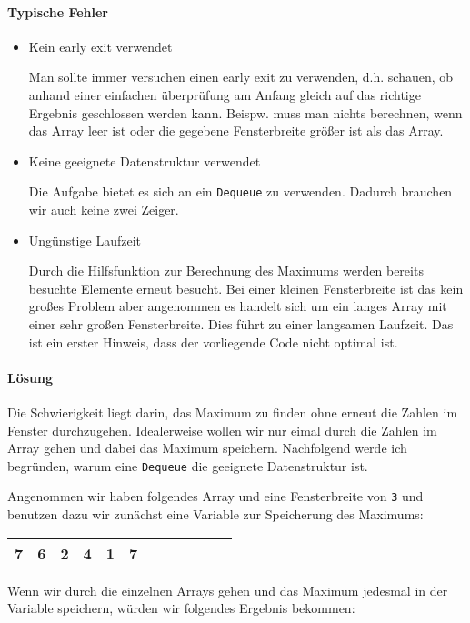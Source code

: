 \documentclass[babel]{book}
\begin{document}
\paragraph{Typische Fehler}
\begin{itemize} 
	\item Kein early exit verwendet
	
	Man sollte immer versuchen einen early exit zu verwenden, d.h. schauen, ob anhand einer einfachen überprüfung am Anfang gleich auf das richtige Ergebnis geschlossen werden kann. Beispw. muss man nichts berechnen, wenn das Array leer ist oder die gegebene Fensterbreite größer ist als das Array.
	
	\item Keine geeignete Datenstruktur verwendet
	
	Die Aufgabe bietet es sich an ein \lstinline|Dequeue| zu verwenden. Dadurch brauchen wir auch keine zwei Zeiger.
	
	\item Ungünstige Laufzeit
	
	Durch die Hilfsfunktion zur Berechnung des Maximums werden bereits besuchte Elemente erneut besucht. Bei einer kleinen Fensterbreite ist das kein großes Problem aber angenommen es handelt sich um ein langes Array mit einer sehr großen Fensterbreite. Dies führt zu einer langsamen Laufzeit. Das ist ein erster Hinweis, dass der vorliegende Code nicht optimal ist.

\end{itemize}

\paragraph{Lösung}
Die Schwierigkeit liegt darin, das Maximum zu finden ohne erneut die Zahlen im Fenster durchzugehen. Idealerweise wollen wir nur eimal durch die Zahlen im Array gehen und dabei das Maximum speichern. Nachfolgend werde ich begründen, warum eine \lstinline|Dequeue| die geeignete Datenstruktur ist.

Angenommen wir haben folgendes Array und eine Fensterbreite von \lstinline|3| und benutzen dazu wir zunächst eine Variable zur Speicherung des Maximums:

\begin{tabular}{|l|l|l|l|l|l|l|l|l|l|l|l|} 
	\hline
	7 & 6 & 2 & 4 & 1 & 7\\
	\hline
\end{tabular}

Wenn wir durch die einzelnen Arrays gehen und das Maximum jedesmal in der Variable speichern, würden wir folgendes Ergebnis bekommen:
\end{document}
